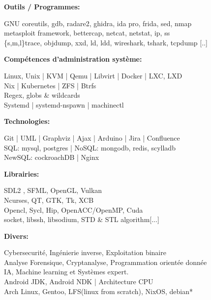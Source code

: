 \documentclass[a4paper,10pt]{article}
\begin{document}
\begin{adjustbox}{valign=t}
\begin{minipage}{0.6\textwidth}
\begin{description}
\begin{spacing}{0.95}
\item{\textbf{Outils / Programmes:}}

    GNU coreutils, gdb, radare2, ghidra, ida pro, frida, sed, nmap\\
    metasploit framework, bettercap, netcat, netstat, ip, ss\\
    \{s,m,l\}trace, objdump, xxd, ld, ldd, wireshark, tshark, tcpdump {[..]}

\item{\textbf{Compétences d'administration système:}}

    Linux, Unix | KVM | Qemu | Libvirt | Docker | LXC, LXD\\
    Nix | Kubernetes | ZFS | Btrfs\\
    Regex, globs \& wildcards\\
    Systemd | systemd-nspawn | machinectl

\item{\textbf{Technologies:}}

    Git | UML | Graphviz | Ajax | Arduino | Jira | Confluence\\
    SQL: mysql, postgres | NoSQL: mongodb, redis, scylladb\\
    NewSQL: cockroachDB | Nginx

\item{\textbf{Librairies:}}

    SDL2 , SFML, OpenGL, Vulkan\\
    Ncurses, QT, GTK, Tk, XCB\\
    Opencl, Sycl, Hip, OpenACC/OpenMP, Cuda\\
    socket, libssh, libsodium, STD \& STL algorithm{[...]}

\item{\textbf{Divers:}}

    Cybersecurité, Ingénierie inverse, Exploitation binaire\\
		Analyse Forensique, Cryptanalyse, Programmation orientée donnée\\
    IA, Machine learning et Systèmes expert.\\
    Android JDK, Android NDK | Architecture CPU\\
    Arch Linux, Gentoo, LFS(linux from scratch), NixOS, debian*

\vspace{-2.2\baselineskip}
\end{spacing}
\end{description}



\end{minipage}
\end{adjustbox}
\end{document}
